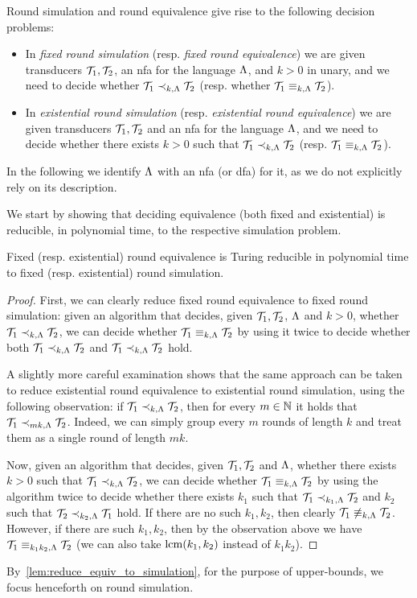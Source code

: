 Round simulation and round equivalence give rise to the following decision problems: 
\begin{itemize}
	\item In \emph{fixed round simulation} (resp. \emph{fixed round equivalence}) we are given transducers $\mathcal{T}_1,\mathcal{T}_2$, an \gls{nfa} for the language $\Lambda$, and $k>0$ in unary, and we need to decide whether $\mathcal{T}_1\prec_{k,\Lambda} \mathcal{T}_2$ (resp. whether $\mathcal{T}_1\equiv_{k,\Lambda}\mathcal{T}_2$).
	\item In \emph{existential round simulation} (resp. \emph{existential round equivalence}) we are given transducers $\mathcal{T}_1,\mathcal{T}_2$ and an \gls{nfa} for the language $\Lambda$, and we need to decide whether there exists $k>0$ such that $\mathcal{T}_1\prec_{k,\Lambda} \mathcal{T}_2$ (resp. $\mathcal{T}_1\equiv_{k,\Lambda}\mathcal{T}_2$). 
\end{itemize}
In the following we identify $\Lambda$ with an \gls{nfa} (or \gls{dfa}) for it, as we do not explicitly rely on its description.

We start by showing that deciding equivalence (both fixed and existential) is reducible, in polynomial time, to the respective simulation problem.
\begin{lemma}
	\label{lem:reduce_equiv_to_simulation}
    Fixed (resp. existential) round equivalence is Turing reducible in polynomial time to fixed (resp. existential) round simulation.
\end{lemma}
\begin{proof}
First, we can clearly reduce fixed round equivalence to fixed round simulation: given an algorithm that decides, given $\mathcal{T}_1,\mathcal{T}_2$, $\Lambda$ and $k>0$, whether $\mathcal{T}_1\prec_{k,\Lambda} \mathcal{T}_2$, we can decide whether $\mathcal{T}_1\equiv_{k,\Lambda} \mathcal{T}_2$ by using it twice to decide whether both $\mathcal{T}_1\prec_{k,\Lambda} \mathcal{T}_2$ and $\mathcal{T}_1\prec_{k,\Lambda} \mathcal{T}_2$ hold. 

A slightly more careful examination shows that the same approach can be taken to reduce existential round equivalence to existential round simulation, using the following observation: if $\mathcal{T}_1\prec_{k,\Lambda} \mathcal{T}_2$, then for every $m\in \mathbb{N}$ it holds that $\mathcal{T}_1\prec_{mk,\Lambda}\mathcal{T}_2$. Indeed, we can simply group every $m$ rounds of length $k$ and treat them as a single round of length $mk$.

Now, given an algorithm that decides, given $\mathcal{T}_1,\mathcal{T}_2$ and $\Lambda$, whether there exists $k>0$ such that $\mathcal{T}_1\prec_{k,\Lambda} \mathcal{T}_2$, we can decide whether $\mathcal{T}_1\equiv_{k,\Lambda} \mathcal{T}_2$ by using the algorithm twice to decide whether there exists $k_1$ such that $\mathcal{T}_1\prec_{k_1,\Lambda} \mathcal{T}_2$ and $k_2$ such that $\mathcal{T}_2\prec_{k_2,\Lambda} \mathcal{T}_1$ hold. If there are no such $k_1,k_2$, then clearly $\mathcal{T}_1 \not\equiv_{k,\Lambda} \mathcal{T}_2$. However, if there are such $k_1,k_2$, then by the observation above we have $\mathcal{T}_1\equiv_{k_1k_2,\Lambda}\mathcal{T}_2$ (we can also take ${\rm lcm}(k_1,k_2)$ instead of $k_1k_2$).
\end{proof}
 
By~\cref{lem:reduce_equiv_to_simulation}, for the purpose of upper-bounds, we focus henceforth on round simulation.
